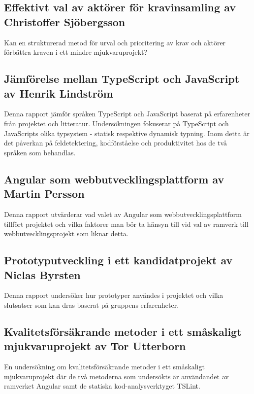 \subsection{Effektivt val av aktörer för kravinsamling av Christoffer Sjöbergsson}
Kan en strukturerad metod för urval och prioritering av krav och aktörer förbättra kraven i ett mindre mjukvaruprojekt?
\subsection{Jämförelse mellan TypeScript och JavaScript av Henrik Lindström}
Denna rapport jämför språken TypeScript och JavaScript baserat på erfarenheter från projektet och litteratur. Undersökningen fokuserar på TypeScript och JavaScripts olika typsystem - statisk respektive dynamisk typning. Inom detta är det påverkan på feldetektering, kodförståelse och produktivitet hos de två språken som behandlas.
\subsection{Angular som webbutvecklingsplattform av Martin Persson}
Denna rapport utvärderar vad valet av Angular som webbutvecklingsplattform tillfört projektet och vilka faktorer man bör ta hänsyn till vid val av ramverk till webbutvecklingsprojekt som liknar detta.  
\subsection{Prototyputveckling i ett kandidatprojekt av Niclas Byrsten}
Denna rapport undersöker hur prototyper användes i projektet och vilka slutsatser som kan dras baserat på gruppens erfarenheter.
\subsection{Kvalitetsförsäkrande metoder i ett småskaligt mjukvaruprojekt av Tor Utterborn}
En undersökning om kvalitetsförsäkrande metoder i ett småskaligt mjukvaruprojekt där de två metoderna som undersökts är användandet av ramverket Angular samt de statiska kod-analysverktyget TSLint.
